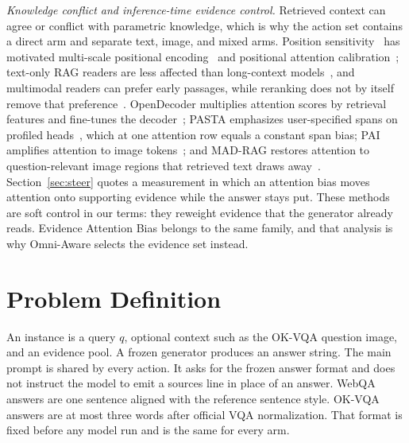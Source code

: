 \documentclass[sigconf,anonymous,review]{acmart}
\newcommand{\method}{Omni-Aware}
\begin{document}
\textit{Knowledge conflict and inference-time evidence control.}
Retrieved context can agree or conflict with parametric knowledge, which is why the action set contains a direct arm and separate text, image, and mixed arms.
Position sensitivity~\cite{liu2024lost} has motivated multi-scale positional encoding~\cite{zhang2024mspoe} and positional attention calibration~\cite{hsieh2024found}; text-only RAG readers are less affected than long-context models~\cite{cuconasu2025positional}, and multimodal readers can prefer early passages, while reranking does not by itself remove that preference~\cite{liu2026lostend}.
OpenDecoder multiplies attention scores by retrieval features and fine-tunes the decoder~\cite{mo2026opendecoder}; PASTA emphasizes user-specified spans on profiled heads~\cite{zhang2024pasta}, which at one attention row equals a constant span bias; PAI amplifies attention to image tokens~\cite{liu2024pai}; and MAD-RAG restores attention to question-relevant image regions that retrieved text draws away~\cite{zhao2026madrag}.
Section~\ref{sec:steer} quotes a measurement in which an attention bias moves attention onto supporting evidence while the answer stays put.
These methods are soft control in our terms: they reweight evidence that the generator already reads. Evidence Attention Bias belongs to the same family, and that analysis is why \method{} selects the evidence set instead.

\section{Problem Definition}
\label{sec:problem}

An instance is a query $q$, optional context such as the OK-VQA question image, and an evidence pool.
A frozen generator produces an answer string.
The main prompt is shared by every action.
It asks for the frozen answer format and does not instruct the model to emit a sources line in place of an answer.
WebQA answers are one sentence aligned with the reference sentence style.
OK-VQA answers are at most three words after official VQA normalization.
That format is fixed before any model run and is the same for every arm.
\end{document}
